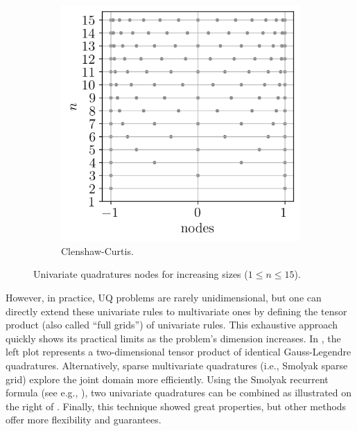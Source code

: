 \begin{figure}[ht]
\begin{subfigure}[b]{0.32\textwidth}
        \includegraphics[width=\textwidth]{../numerical_experiments/chapter1/figures/univariate_clenshaw_curtis.png}
        \caption{Clenshaw-Curtis.}
    \end{subfigure}
    \caption{Univariate quadratures nodes for increasing sizes ($1 \leq n \leq 15$).}
    \label{fig:univariate_quads}
\end{figure}


However, in practice, UQ problems are rarely unidimensional, but one can directly extend these univariate rules to multivariate ones by defining the tensor product (also called ``full grids'') of univariate rules. 
This exhaustive approach quickly shows its practical limits as the problem's dimension increases. 
In , the left plot represents a two-dimensional tensor product of identical Gauss-Legendre quadratures. 
Alternatively, sparse multivariate quadratures (i.e., Smolyak sparse grid) explore the joint domain more efficiently. 
Using the Smolyak recurrent formula (see e.g., \citealp{sullivan_2015}), two univariate quadratures can be combined as illustrated on the right of . 
Finally, this technique showed great properties, but other methods offer more flexibility and guarantees.

